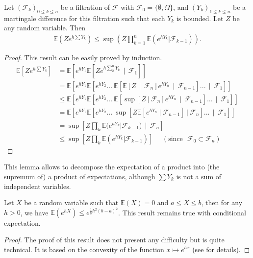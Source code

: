\begin{lemma}
 \label{lemme_mg}
Let $(\mathcal{F}_k)_{0\leq k \leq n}$ be a filtration of $\mathcal{F}$ with $ \mathcal{F}_0 =  \{\emptyset , \Omega\} $, and $(Y_k)_{1 \leq k \leq n}$ be a martingale difference for this filtration such that each $Y_k$ is bounded. Let $Z$ be any random variable. Then
\begin{align*} \mathbb{E}(Z e^{h\sum Y_k}) \leq \sup(Z \prod_{k=1}^n \mathbb{E}(e^{hY_k}|\mathcal{F}_{k-1} )).
\end{align*}
\end{lemma}
\begin{proof}
This result can be easily proved by induction.
\begin{align*}
\mathbb{E}\left[Z e^{h\sum Y_k}\right] &= \mathbb{E}\left[e^{hY_1}\mathbb{E}\left[ Z e^{h\sum_{2}^n Y_k} ~~|~~ \mathcal{F}_1\right]\right]  \\ &= \mathbb{E}\left[e^{hY_1}\mathbb{E}\left[ e^{hY_2} ...~ \mathbb{E}\left[ \mathbb{E}\left[ Z ~~|~~ \mathcal{F}_n \right] e^{hY_n} ~~|~~ \mathcal{F}_{n-1} \right] ... ~~|~~\mathcal{F}_1 \right] \right]
\\ &\le \mathbb{E}\left[e^{hY_1}\mathbb{E}\left[ e^{hY_2} ...~ \mathbb{E}\left[ \sup\left[ Z ~|~ \mathcal{F}_n \right] e^{hY_n} ~~|~~ \mathcal{F}_{n-1} \right] ... ~~|~~\mathcal{F}_1 \right] \right]
\\ &= \mathbb{E}\left[e^{hY_1}\mathbb{E}\left[ e^{hY_2} ...~  \sup\left[ Z\mathbb{E}\left[e^{hY_n} ~|~ \mathcal{F}_{n-1} \right] ~|~ \mathcal{F}_n \right]  ... ~~|~~\mathcal{F}_1 \right] \right]
\\ &= \sup\left[Z \prod_{k} \mathbb{E}(e^{hY_k}|\mathcal{F}_{k-1} )~~|~~ \mathcal{F}_n\right]
\\ &\le \sup\left[Z \prod_{k} \mathbb{E}(e^{hY_k}|\mathcal{F}_{k-1} )\right]~~~~~~(\text{since~~} \mathcal{F}_0 \subset \mathcal{F}_n)
\end{align*}
\end{proof}

This lemma allows to decompose the expectation of a product into (the supremum of) a product of expectations, although $\sum Y_k$ is not a sum of independent variables.


\begin{lemma} 
 \label{lemme_u}
Let $X$ be a random variable such that $\mathbb{E}(X) = 0 $ and $a \leq X \leq b$, then for any $h>0$, we have $\mathbb{E}(e^{hX}) \leq e^{\frac{1}{8}h^2(b-a)^2} $.
This result remains true with conditional expectation.%
\end{lemma}
\begin{proof}
The proof of this result does not present any difficulty but is quite technical. It is based on the convexity of the function
$x \mapsto e^{hx}$ (see \cite{McDiarmid98} for details).
\end{proof}

